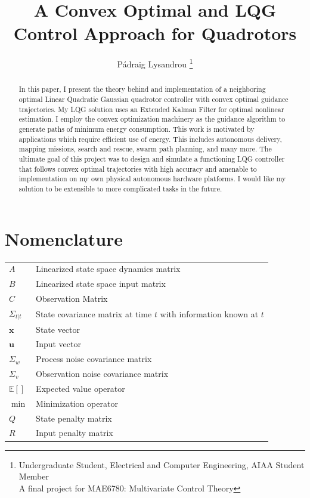\documentclass[conf]{new-aiaa}
\title{A Convex Optimal and LQG Control Approach for Quadrotors}
\author{Pádraig Lysandrou
\footnote{Undergraduate Student, Electrical and Computer Engineering, AIAA Student Member \\ A final project for MAE6780: Multivariate Control Theory}}
\affil{Cornell University, Ithaca, New York, 14853}
\begin{document}
\maketitle
{}

\begin{abstract}
In this paper, I present the theory behind and implementation of a neighboring optimal Linear Quadratic Gaussian quadrotor controller with convex optimal guidance trajectories. My LQG solution uses an Extended Kalman Filter for optimal nonlinear estimation. I employ the convex optimization machinery as the guidance algorithm to generate paths of minimum energy consumption. This work is motivated by applications which require efficient use of energy. This includes autonomous delivery, mapping missions, search and rescue, swarm path planning, and many more. The ultimate goal of this project was to design and simulate a functioning LQG controller that follows convex optimal trajectories with high accuracy and amenable to implementation on my own physical autonomous hardware platforms. I would like my solution to be extensible to more complicated tasks in the future.
\end{abstract}


\section*{Nomenclature}

{\renewcommand\arraystretch{1.0}
\noindent\begin{longtable*}{@{}l @{\quad=\quad} l@{}}
$A$ & Linearized state space dynamics matrix\\
$B$ & Linearized state space input matrix\\
$C$ & Observation Matrix \\
$\Sigma_{t|t}$ & State covariance matrix at time $t$ with information known at $t$\\
$\mathbf{x}$ & State vector\\
$\mathbf{u}$ & Input vector\\
$\Sigma_w$ &Process noise covariance matrix\\
$\Sigma_v$ & Observation noise covariance matrix \\
$\mathbb{E}[]$ &Expected value operator \\
$\min$ &Minimization operator \\
$Q$ &State penalty matrix \\
$R$ &Input penalty matrix \\
\end{longtable*}}
\end{document}
